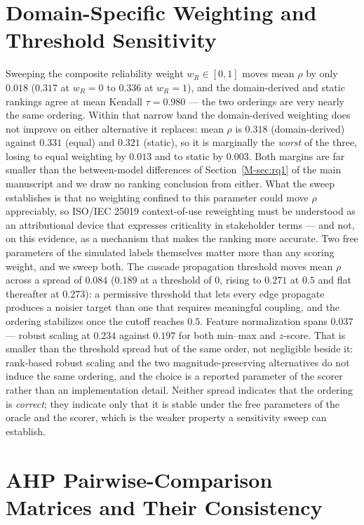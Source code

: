 \documentclass[preprint,3p]{elsarticle}
\begin{document}
\section{Domain-Specific Weighting and Threshold Sensitivity}

Sweeping the composite reliability weight $w_R \in [0, 1]$ moves mean $\rho$ by only $0.018$ ($0.317$ at $w_R = 0$ to $0.336$ at $w_R = 1$), and the domain-derived and static rankings agree at mean Kendall $\tau = 0.980$ --- the two orderings are very nearly the same ordering. Within that narrow band the domain-derived weighting does not improve on either alternative it replaces: mean $\rho$ is $0.318$ (domain-derived) against $0.331$ (equal) and $0.321$ (static), so it is marginally the \emph{worst} of the three, losing to equal weighting by $0.013$ and to static by $0.003$. Both margins are far smaller than the between-model differences of Section~\ref{M-sec:rq1} of the main manuscript and we draw no ranking conclusion from either. What the sweep establishes is that no weighting confined to this parameter could move $\rho$ appreciably, so ISO/IEC 25019 context-of-use reweighting must be understood as an attributional device that expresses criticality in stakeholder terms --- and not, on this evidence, as a mechanism that makes the ranking more accurate. Two free parameters of the simulated labels themselves matter more than any scoring weight, and we sweep both. The cascade propagation threshold moves mean $\rho$ across a spread of $0.084$ ($0.189$ at a threshold of $0$, rising to $0.271$ at $0.5$ and flat thereafter at $0.273$): a permissive threshold that lets every edge propagate produces a noisier target than one that requires meaningful coupling, and the ordering stabilizes once the cutoff reaches $0.5$. Feature normalization spans $0.037$ --- robust scaling at $0.234$ against $0.197$ for both min--max and $z$-score. That is smaller than the threshold spread but of the same order, not negligible beside it: rank-based robust scaling and the two magnitude-preserving alternatives do not induce the same ordering, and the choice is a reported parameter of the scorer rather than an implementation detail. Neither spread indicates that the ordering is \emph{correct}; they indicate only that it is stable under the free parameters of the oracle and the scorer, which is the weaker property a sensitivity sweep can establish.

\section{AHP Pairwise-Comparison Matrices and Their Consistency}
\label{supp:ahp}
\end{document}
